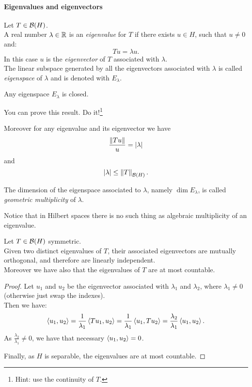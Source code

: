 \paragraph{Eigenvalues and eigenvectors}

\begin{defn}
	Let $T \in \mathcal B(H)$.\\
	A real number $\lambda \in \mathbb R$ is an \emph{eigenvalue} for $T$ if there exists $u \in H$, such that $u \neq 0$ and:
	$$
	Tu 
	= \lambda u
	.
	$$
	In this case $u$ is the \emph{eigenvector} of $T$ associated with $\lambda$. \\
	The linear subspace generated by all the eigenvectors associated with $\lambda$ is called \emph{eigenspace} of $\lambda$ and is denoted with $E_\lambda$.
\end{defn}

\begin{prop}
	Any eigenspace $E_\lambda$ is closed.
\end{prop}
You can prove this result. Do it!\footnote{Hint: use the continuity of $T$.}

Moreover for any eigenvalue and its eigenvector we have
$$
\frac{\left\lVert Tu\right\rVert}{u} 
= |\lambda|
$$
 and 
$$
|\lambda|
\leq \left\lVert T\right\rVert_{\mathcal B(H)}
.
$$

\begin{defn}
	The dimension of the eigenspace associated to $\lambda$, namely $\dim E_\lambda$, is called \emph{geometric multiplicity} of $\lambda$.
\end{defn}
Notice that in Hilbert spaces there is no such thing as algebraic multiplicity of an eigenvalue.

\begin{prop}
	Let $T \in \mathcal B(H)$ symmetric.\\
	Given two distinct eigenvalues of $T$, their associated eigenvectors are mutually orthogonal, and therefore are linearly independent.\\
	Moreover we have also that the eigenvalues of $T$ are at most countable.
\end{prop}

\begin{proof}
	Let $u_1$ and $u_2$ be the eigenvector associated with $\lambda_1$ and $\lambda_2$, where $\lambda_1\neq 0$ (otherwise just swap the indexes).\\
	Then we have:
	$$
	\left\langle u_1,u_2\right\rangle 
	=\frac{1}{\lambda_1}\left\langle Tu_1,u_2\right\rangle 
	= \frac{1}{\lambda_1}\left\langle u_1, T u_2\right\rangle 
	= \frac{\lambda_2}{\lambda_1}\left\langle u_1, u_2\right\rangle
	.
	$$
	As $\frac{\lambda_2}{\lambda_1} \neq 0$, we have that necessary $\left\langle u_1, u_2\right\rangle =0$.

	Finally, as $H$ is separable, the eigenvalues are at most countable.%
\end{proof}


